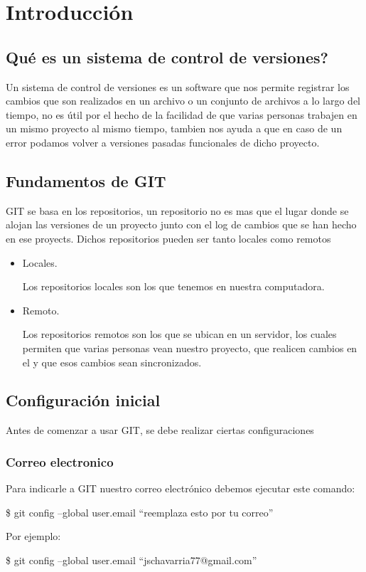 \section{Introducci\'on}
    \subsection{Qu\'e es un sistema de control de versiones?}
        Un sistema de control de versiones es un software que nos permite registrar los cambios que son realizados en un archivo o un conjunto de archivos a lo largo del tiempo, no es \'util por el hecho de la facilidad de que varias personas trabajen en un mismo proyecto al mismo tiempo, tambien nos ayuda a que en caso de un error podamos volver a versiones pasadas funcionales de dicho proyecto.

    \subsection{Fundamentos de GIT}
        GIT se basa en los repositorios, un repositorio no es mas que el lugar donde se alojan las versiones de un proyecto junto con el log de cambios que se han hecho en ese proyects.
        Dichos repositorios pueden ser tanto locales como remotos
            \begin{itemize}
                \item Locales.

                    Los repositorios locales son los que tenemos en nuestra computadora.

                \item Remoto.

                    Los repositorios remotos son los que se ubican en un servidor, los cuales permiten que varias personas vean nuestro proyecto, que realicen cambios en el y que esos cambios sean sincronizados.
            \end{itemize}

    \subsection{Configuraci\'on inicial}
            Antes de comenzar a usar GIT, se debe realizar ciertas configuraciones
            \subsubsection{Correo electronico}
                Para indicarle a GIT nuestro correo electr\'onico debemos ejecutar este comando:
                    \begin{lstlistings}
                        \$ git config --global user.email ``reemplaza esto por tu correo''
                    \end{lstlistings}
                    Por ejemplo:
                    \begin{lstlistings}
                        \$ git config --global user.email ``jschavarria77@gmail.com''
                    \end{lstlistings}
